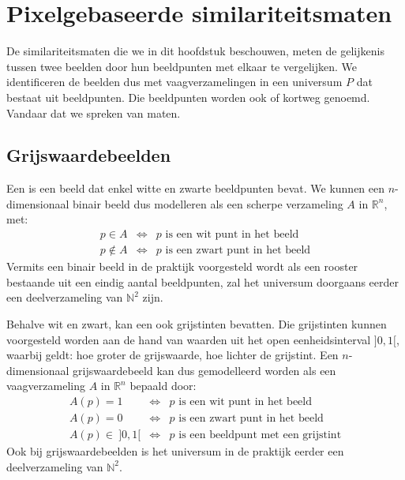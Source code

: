 \chapter{Pixelgebaseerde similariteitsmaten}

De similariteitsmaten die we in dit hoofdstuk beschouwen,
meten de gelijkenis tussen twee beelden door hun beeldpunten met elkaar te vergelijken.
We identificeren de beelden dus met vaagverzamelingen in een universum $P$ dat bestaat uit 
beeldpunten. Die beeldpunten worden ook  of kortweg  genoemd. 
Vandaar dat we spreken van  maten.

\section{Grijswaardebeelden}


Een  is een beeld dat enkel witte en zwarte beeldpunten bevat. We kunnen een 
$n$-dimensionaal binair beeld dus modelleren als een scherpe verzameling $A$ in $\mathbb{R}^n$, met:
\begin{displaymath}
\begin{array}{rcl}
p \in A & \iff & p \textrm{ is een wit punt in het beeld} \\
p \notin A & \iff & p \textrm{ is een zwart punt in het beeld}
\end{array}
\end{displaymath}
Vermits een binair beeld in de praktijk voorgesteld wordt als een rooster bestaande uit een
eindig aantal beeldpunten, zal het universum doorgaans eerder een deelverzameling van $\mathbb{N}^2$ zijn.

Behalve wit en zwart, kan een  ook grijstinten bevatten. Die grijstinten
kunnen voorgesteld worden aan de hand van waarden uit het open eenheidsinterval $]0,1[$, waarbij
geldt: hoe groter de grijswaarde, hoe lichter de grijstint. Een $n$-dimensionaal grijswaardebeeld
kan dus gemodelleerd worden als een vaagverzameling $A$ in $\mathbb{R}^n$ bepaald door:
\begin{displaymath}
\begin{array}{rcl}
A(p) = 1 & \iff & p \textrm{ is een wit punt in het beeld} \\
A(p) = 0 & \iff & p \textrm{ is een zwart punt in het beeld} \\
A(p) \in\ ]0,1[ & \iff & p \textrm{ is een beeldpunt met een grijstint}
\end{array}
\end{displaymath}
Ook bij grijswaardebeelden is het universum in de praktijk eerder een deelverzameling van $\mathbb{N}^2$.

